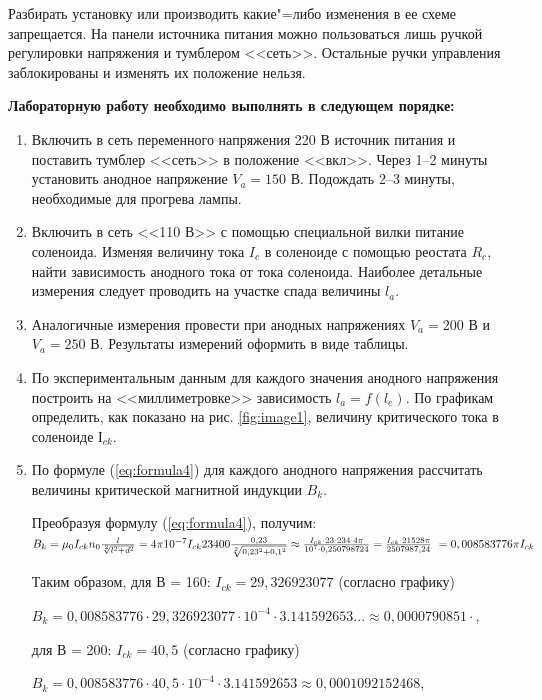 Разбирать установку или производить какие"=либо изменения в ее схеме запрещается. На панели источника питания можно пользоваться лишь ручкой регулировки напряжения и тумблером <<сеть>>. Остальные ручки управления заблокированы и изменять их положение нельзя.

\textbf{Лабораторную работу необходимо выполнять в следующем порядке:}

\begin{enumerate}
    \item{ Включить в сеть переменного напряжения 220 В источник питания и поставить тумблер <<сеть>> в положение <<вкл>>. Через 1--2 минуты установить анодное напряжение $V_a = 150$ В. Подождать 2--3 минуты, необходимые для прогрева лампы. }
    \item{ Включить в сеть <<110 В>> с помощью специальной вилки питание соленоида. Изменяя величину тока $I_c$ в соленоиде с помощью реостата $R_c$, найти зависимость анодного тока от тока соленоида. Наиболее детальные измерения следует проводить на участке спада величины $l_a$. }
    \item{ Аналогичные измерения провести при анодных напряжениях $V_a = 200$ В и $V_a = 250$ В. Результаты измерений оформить в виде таблицы. }
    \item{ По экспериментальным данным для каждого значения анодного напряжения построить на <<миллиметровке>> зависимость $l_a = f(l_e)$. По графикам определить, как показано на рис. \ref{fig:image1}, величину критического тока в соленоиде $І_{ck}$. }
    \item{ По формуле (\ref{eq:formula4}) для каждого анодного напряжения рассчитать величины критической магнитной индукции $B_k$. }

    Преобразуя формулу (\ref{eq:formula4}), получим:
    $B_k = \mu _0 I_{ck} n_0 \frac{l}{\sqrt[2]{l^2 + d^2}} = \\ 4\pi 10^{-7}I_{ck}23400\frac{0,23}{\sqrt[2]{0,23^2 + 0,1^2}} \approx \frac{I_{ck} \cdot 23 \cdot 234 \cdot 4\pi}{10^{7} \cdot 0,250798724} = \frac{I_{ck} \cdot 21528\pi}{2507987,24} ~= 0,008583776\pi I_{ck}$

    Таким образом, для В = 160: $I_{ck} = 29,326923077$ (согласно графику)
    
    $B_k = 0,008583776 \cdot 29,326923077 \cdot 10^{-4} \cdot 3.141592653... \approx 0,0000790851\cdot$,

    для В = 200: $I_{ck} = 40,5$ (согласно графику)
    
    $B_k = 0,008583776 \cdot 40,5 \cdot 10^{-4} \cdot 3.141592653 \approx 0,0001092152468$,


\end{enumerate}
